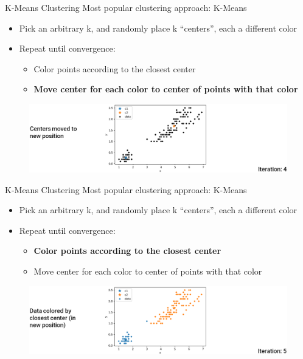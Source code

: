 \documentclass[aspectratio=169]{../latex_main/tntbeamer}  %
\begin{document}
	
	\begin{frame}{K-Means Clustering}
	    Most popular clustering approach: K-Means
	    \begin{itemize}
	        \item Pick an arbitrary k, and randomly place k “centers”, each a different color
	        \item Repeat until convergence:
	        \begin{itemize}
	            \item Color points according to the closest center
	            \item \textbf{Move center for each color to center of points with that color}
	        \end{itemize}
	    \end{itemize}
	    \begin{figure}
	        \centering
	        \includegraphics[scale=.39]{Bild17}
	    \end{figure}
	\end{frame}
	
	
	
	\begin{frame}{K-Means Clustering}
	    Most popular clustering approach: K-Means
	    \begin{itemize}
	        \item Pick an arbitrary k, and randomly place k “centers”, each a different color
	        \item Repeat until convergence:
	        \begin{itemize}
	            \item \textbf{Color points according to the closest center}
	            \item Move center for each color to center of points with that color
	        \end{itemize}
	    \end{itemize}
	    \begin{figure}
	        \centering
	        \includegraphics[scale=.38]{Bild18}
	    \end{figure}
	\end{frame}
	
\end{document}
